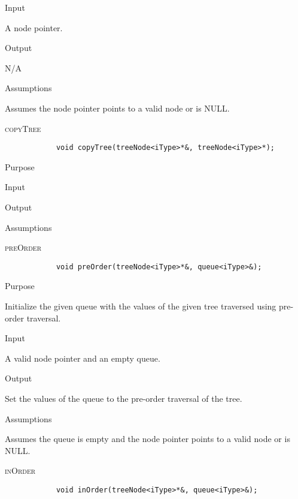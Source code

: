 \documentclass[pdftex, 12pt]{article}
\begin{document}
\begin{description}
\begin{description}
			\item{Input}

				A node pointer.

			\item{Output}

				N/A

			\item{Assumptions}

				Assumes the node pointer points to a valid node or is NULL.

		\end{description}
	\item{\textsc{copyTree}}
		\begin{lstlisting}
			void copyTree(treeNode<iType>*&, treeNode<iType>*);
		\end{lstlisting}
		\begin{description}

			\item{Purpose}

			\item{Input}

			\item{Output}

			\item{Assumptions}

		\end{description}
	\item{\textsc{preOrder}}
		\begin{lstlisting}
			void preOrder(treeNode<iType>*&, queue<iType>&);
		\end{lstlisting}
		\begin{description}

			\item{Purpose}
				
				Initialize the given queue with the values of the given tree traversed using pre-order traversal.

			\item{Input}

				A valid node pointer and an empty queue.

			\item{Output}

				Set the values of the queue to the pre-order traversal of the tree.

			\item{Assumptions}

				Assumes the queue is empty and the node pointer points to a valid node or is NULL.

		\end{description}
	\item{\textsc{inOrder}}
		\begin{lstlisting}
			void inOrder(treeNode<iType>*&, queue<iType>&);
		\end{lstlisting}
		\begin{description}


\end{description}
\end{description}
\end{document}
